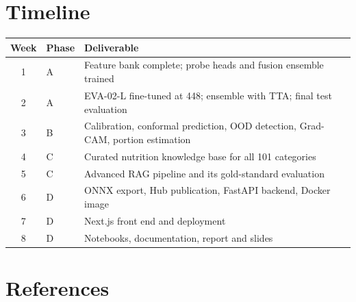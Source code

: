 \documentclass[12pt,a4paper,oneside]{report}
\begin{document}
\chapter{Timeline}

\begin{table}[h]
\centering
\begin{tabular}{clp{7.4cm}}
\toprule
\textbf{Week} & \textbf{Phase} & \textbf{Deliverable} \\
\midrule
1 & A & Feature bank complete; probe heads and fusion ensemble trained \\
2 & A & EVA-02-L fine-tuned at 448; ensemble with TTA; final test evaluation \\
3 & B & Calibration, conformal prediction, OOD detection, Grad-CAM, portion
estimation \\
4 & C & Curated nutrition knowledge base for all 101 categories \\
5 & C & Advanced RAG pipeline and its gold-standard evaluation \\
6 & D & ONNX export, Hub publication, FastAPI backend, Docker image \\
7 & D & Next.js front end and deployment \\
8 & D & Notebooks, documentation, report and slides \\
\bottomrule
\end{tabular}
\end{table}

\chapter*{References}
\end{document}
